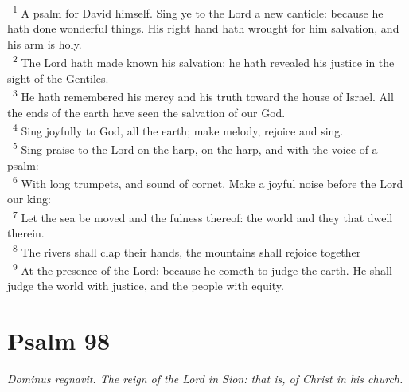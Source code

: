 \documentclass[a5paper,12pt]{article}
\begin{document}
\begin{multicols*}{2}
~\textsuperscript{1} A psalm for David himself. Sing ye to the Lord a new canticle: because he hath done wonderful things. His right hand hath wrought for him salvation, and his arm is holy.\\
~\textsuperscript{2} The Lord hath made known his salvation: he hath revealed his justice in the sight of the Gentiles.\\
~\textsuperscript{3} He hath remembered his mercy and his truth toward the house of Israel. All the ends of the earth have seen the salvation of our God.\\
~\textsuperscript{4} Sing joyfully to God, all the earth; make melody, rejoice and sing.\\
~\textsuperscript{5} Sing praise to the Lord on the harp, on the harp, and with the voice of a psalm:\\
~\textsuperscript{6} With long trumpets, and sound of cornet. Make a joyful noise before the Lord our king:\\
~\textsuperscript{7} Let the sea be moved and the fulness thereof: the world and they that dwell therein.\\
~\textsuperscript{8} The rivers shall clap their hands, the mountains shall rejoice together\\
~\textsuperscript{9} At the presence of the Lord: because he cometh to judge the earth. He shall judge the world with justice, and the people with equity.\\

\section{Psalm 98}
\label{sec:org492977a}
\emph{Dominus regnavit. The reign of the Lord in Sion: that is, of Christ in his church.}\\


\end{multicols*}
\end{document}
